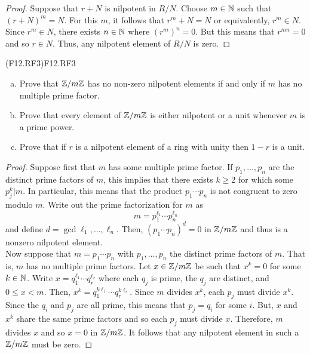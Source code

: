 \documentclass[../../AlgebraQualSolutions.tex]{subfiles}
\begin{document}
\begin{proof}
	Suppose that $r + N$ is nilpotent in $R/N$. Choose $m \in \mathbb{N}$ such that $(r + N)^m = N$. For this $m$, it follows that $r^m + N = N$ or equivalently, $r^m \in N$. Since $r^m \in N$, there exists $n \in \mathbb{N}$ where $(r^m)^n = 0$. But this means that $r^{mn} = 0$ and so $r \in N$. Thus, any nilpotent element of $R/N$ is zero.
\end{proof}

\begin{prob}{(F12.RF3)}{F12.RF3}
\begin{enumerate}[(a)]
\item Prove that $\mathbb{Z}/m\mathbb{Z}$ has no non-zero nilpotent elements if and only if $m$ has no multiple prime factor.
\item Prove that every element of $\mathbb{Z}/m\mathbb{Z}$ is either nilpotent or a unit whenever $m$ is a prime power.
\item Prove that if $r$ is a nilpotent element of a ring with unity then $1-r$ is a unit.
\end{enumerate}
\end{prob}

\begin{proof}
    Suppose first that $m$ has some multiple prime factor. If $p_1,\ldots, p_n$ are the distinct prime factors of $m$, this implies that there exists $k \geq 2$ for which some $p_j^k | m$. In particular, this means that the product $p_1 \cdots p_n$ is not congruent to zero modulo $m$. Write out the prime factorization for $m$ as 
		\[m = p_1^{\ell_1} \cdots p_n^{\ell_n}\]
	and define $d = \gcd{\ell_1,\ldots, \ell_n}$. Then, $(p_1\cdots p_n)^d = 0$ in $\mathbb{Z}/m\mathbb{Z}$ and thus is a nonzero nilpotent element.\\

	Now suppose that $m = p_1 \cdots p_n$ with $p_1,\ldots, p_n$ the distinct prime factors of $m$. That is, $m$ has no multiple prime factors. Let $x \in \mathbb{Z}/m\mathbb{Z}$ be such that $x^k = 0$ for some $k \in \mathbb{N}$. Write $x = q_1^{\ell_1} \cdots q_r^{\ell_r}$ where each $q_j$ is prime, the $q_j$ are distinct, and $0 \leq x < m$. Then, $x^k = q_1^{k\ell_1} \cdots q_r^{k\ell_r}$. Since $m$ divides $x^k$, each $p_j$ must divide $x^k$. Since the $q_i$ and $p_j$ are all prime, this means that $p_j = q_i$ for some $i$. But, $x$ and $x^k$ share the same prime factors and so each $p_j$ must divide $x$. Therefore, $m$ divides $x$ and so $x = 0$ in $\mathbb{Z}/m\mathbb{Z}$. It follows that any nilpotent element in such a $\mathbb{Z}/m\mathbb{Z}$ must be zero.
\end{proof}
\end{document}
